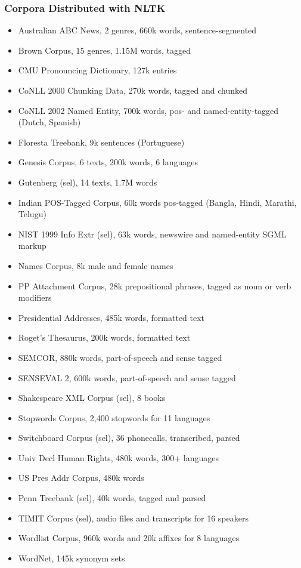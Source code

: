 \documentclass{beamer}             %
\begin{document}
\begin{frame}[fragile]
  \frametitle{Corpora Distributed with NLTK}
  \tiny
  \begin{itemize}
    \item Australian ABC News, 2 genres, 660k words, sentence-segmented
    \item Brown Corpus, 15 genres, 1.15M words, tagged
    \item CMU Pronouncing Dictionary, 127k entries
    \item CoNLL 2000 Chunking Data, 270k words, tagged and chunked
    \item CoNLL 2002 Named Entity, 700k words, pos- and named-entity-tagged (Dutch, Spanish)
    \item Floresta Treebank, 9k sentences (Portuguese)
    \item Genesis Corpus, 6 texts, 200k words, 6 languages
    \item Gutenberg (sel), 14 texts, 1.7M words
    \item Indian POS-Tagged Corpus, 60k words pos-tagged (Bangla, Hindi, Marathi, Telugu)
    \item NIST 1999 Info Extr (sel), 63k words, newswire and named-entity SGML markup
    \item Names Corpus, 8k male and female names
    \item PP Attachment Corpus, 28k prepositional phrases, tagged as noun or verb modifiers
    \item Presidential Addresses, 485k words, formatted text
    \item Roget's Thesaurus, 200k words, formatted text
    \item SEMCOR, 880k words, part-of-speech and sense tagged
    \item SENSEVAL 2, 600k words, part-of-speech and sense tagged
    \item Shakespeare XML Corpus (sel), 8 books
    \item Stopwords Corpus, 2,400 stopwords for 11 languages
    \item Switchboard Corpus (sel), 36 phonecalls, transcribed, parsed
    \item Univ Decl Human Rights, 480k words, 300+ languages
    \item US Pres Addr Corpus, 480k words
    \item Penn Treebank (sel), 40k words, tagged and parsed
    \item TIMIT Corpus (sel), audio files and transcripts for 16 speakers
    \item Wordlist Corpus, 960k words and 20k affixes for 8 languages
    \item WordNet, 145k synonym sets
  \end{itemize}
\end{frame}
\end{document}
